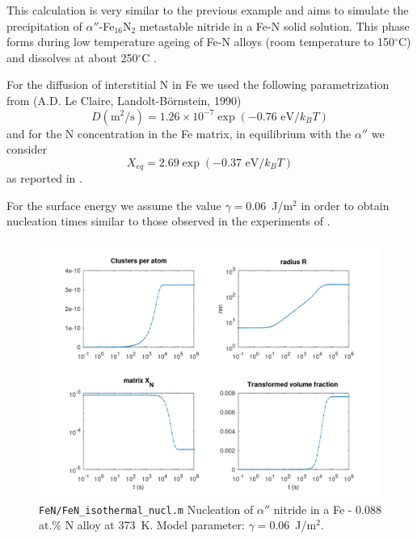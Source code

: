 \documentclass[12pt,a4paper]{article}
\begin{document}
This calculation is very similar to the previous example and aims to simulate the precipitation of $\alpha ''$-Fe$_16$N$_2$ metastable nitride  in a Fe-N solid solution. This phase forms during low temperature ageing of Fe-N alloys (room temperature to 150$^\circ$C) and dissolves at about 250$^\circ$C \citep{Jack-1994-ID1207}.

For the diffusion of interstitial N in Fe we used the following parametrization from (A.D. Le Claire, Landolt-B{\"o}rnstein, 1990)
\begin{equation}
D(\text{m}^2/\text{s}) = 1.26\times 10^{-7}
\exp\left( -0.76\text{ eV}/k_B T \right) 
\end{equation}
and for the N concentration in the Fe matrix, in equilibrium with the $\alpha ''$ we consider
\begin{equation}
X_{eq} = 2.69
\exp\left( -0.37\text{ eV}/k_B T \right) 
\end{equation}
as reported in \citet{Wriedt-1987-ID1192}. 

For the surface energy we assume the value $\gamma = 0.06$~J/m$^2$ in order to obtain nucleation times similar to those observed in the experiments of \citet{Abiko-1977-ID656}.


\begin{figure}[h]
\centering
\includegraphics[width=\textwidth]{../FeN/FeN_isothermal_nucl.png} 
\caption{\texttt{FeN/FeN\_isothermal\_nucl.m} Nucleation of $\alpha ''$ nitride in a 
Fe - 0.088 at.\% N alloy at 373~K. 
Model parameter: $\gamma = 0.06$~J/m$^2$.
}
\end{figure}

\pagebreak
\end{document}
